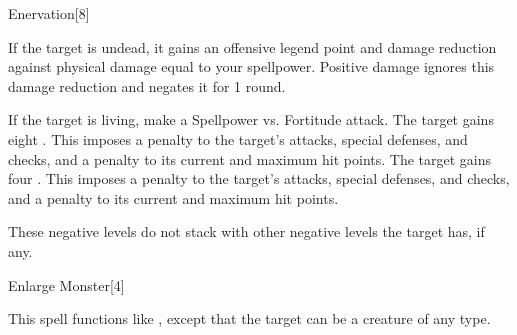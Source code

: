 \begin{spellsection}[Greater]{Enervation}[8]
    \begin{spellheader}
    \end{spellheader}
    \begin{spellcontent}
        \begin{spelltargetinginfo}
        \end{spelltargetinginfo}
        \begin{spelleffects}
            \spelleffect If the target is undead, it gains an offensive legend point and damage reduction against physical damage equal to your spellpower. Positive damage ignores this damage reduction and negates it for 1 round.
            \begin{spellattacktriggered}{If the target is living, make a Spellpower vs. Fortitude attack.}
                \spellsuccess The target gains eight . This imposes a  penalty to the target's attacks, special defenses, and checks, and a  penalty to its current and maximum hit points.
                \spellsuccess The target gains four . This imposes a  penalty to the target's attacks, special defenses, and checks, and a  penalty to its current and maximum hit points.
            \end{spellattacktriggered}
        \end{spelleffects}
    \end{spellcontent}
    \begin{spellfooter}
        \spellnotes These negative levels do not stack with other negative levels the target has, if any.
        \miscastrandom
    \end{spellfooter}
\end{spellsection}

\begin{spellsection}{Enlarge Monster}[4]
    \begin{spellheader}
    \end{spellheader}
    \begin{spellcontent}
        \begin{spelltargetinginfo}
        \end{spelltargetinginfo}
        \begin{spelleffects}
            \spellspecial This spell functions like , except that the target can be a creature of any type.
        \end{spelleffects}
    \end{spellcontent}
    \begin{spellfooter}
        \spellnotes \sizingspellnotes
        \miscastrandom
    \end{spellfooter}
\end{spellsection}

